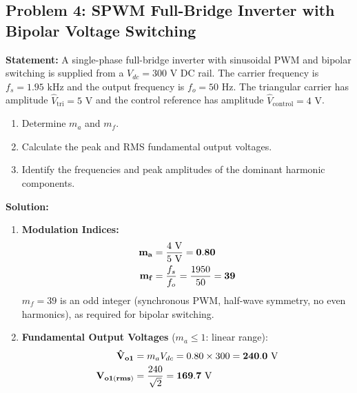 \documentclass[11pt,a4paper]{article}
\let\origsubsection\subsection
\renewcommand{\subsection}{\Needspace{7\baselineskip}\origsubsection}
\begin{document}
\subsection{Problem 4: SPWM Full-Bridge Inverter with Bipolar Voltage Switching}
\begin{examplebox}
\textbf{Statement:} A single-phase full-bridge inverter with sinusoidal PWM and bipolar switching is supplied from a $V_{dc} = 300\text{ V}$ DC rail. The carrier frequency is $f_s = 1.95\text{ kHz}$ and the output frequency is $f_o = 50\text{ Hz}$. The triangular carrier has amplitude $\hat{V}_{\text{tri}} = 5\text{ V}$ and the control reference has amplitude $\hat{V}_{\text{control}} = 4\text{ V}$.
\begin{enumerate}
  \item Determine $m_a$ and $m_f$.
  \item Calculate the peak and RMS fundamental output voltages.
  \item Identify the frequencies and peak amplitudes of the dominant harmonic components.
\end{enumerate}

\tcblower
\textbf{Solution:}
\begin{enumerate}
  \item \textbf{Modulation Indices:}
  \begin{align*}
  \mathbf{m_a} &= \frac{4\text{ V}}{5\text{ V}} = \mathbf{0.80} \notag\\
  \mathbf{m_f} &= \frac{f_s}{f_o} = \frac{1950}{50} = \mathbf{39}
  \end{align*}
  $m_f = 39$ is an odd integer (synchronous PWM, half-wave symmetry, no even harmonics), as required for bipolar switching.

  \item \textbf{Fundamental Output Voltages} ($m_a \le 1$: linear range):
  \begin{align*}
  \mathbf{\hat{V}_{o1}} &= m_a V_{dc} = 0.80 \times 300 = \mathbf{240.0\text{ V}} \notag\\
  \mathbf{V_{o1(rms)}} &= \frac{240}{\sqrt{2}} = \mathbf{169.7\text{ V}}
  \end{align*}


\end{enumerate}
\end{examplebox}
\end{document}
